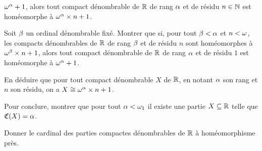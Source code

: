 \begin{problem}
\begin{pbQuest}[resume]
    $\omega^{\alpha} + 1$, alors tout compact dénombrable de $\mathbb R$ de rang $\alpha$
    et de résidu $n\in\mathbb N$ est homéomorphe à $\omega^{\alpha}\times n + 1$.
  \item Soit $\beta$ un ordinal dénombrable fixé. Montrer que si, pour tout
    $\beta < \alpha$ et $n < \omega$, les compacts dénombrables de $\mathbb R$ de rang
    $\beta$ et de résidu $n$ sont homéomorphes à $\omega^{\beta} \times n + 1$,
    alors tout compact dénombrable de $\mathbb R$ de rang $\alpha$ et de résidu $1$
    est homéomorphe à $\omega^{\alpha} + 1$.
  \item En déduire que pour tout compact dénombrable $X$ de $\mathbb R$, en notant
    $\alpha$ son rang et $n$ son résidu, on a
    $X \cong \omega^{\alpha} \times n + 1$.
  \item Pour conclure, montrer que pour tout $\alpha < \omega_1$ il existe une
    partie $X\subseteq \mathbb R$ telle que $\mathfrak{C}(X) = \alpha$.
  \item Donner le cardinal des parties compactes dénombrables de $\mathbb R$ à
    homéomorphisme près.
  \end{pbQuest}
\end{problem}
